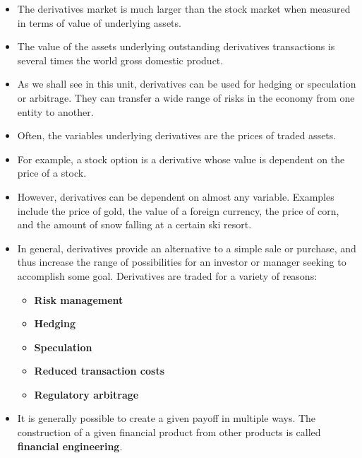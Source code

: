 \documentclass[letterpaper,10pt]{article}
\begin{document}
\begin{itemize}

\item The derivatives market is much larger than the stock market when measured in terms of value of underlying assets. 

\item The value of the assets underlying outstanding derivatives transactions is several times the world gross domestic product. 

\item As we shall see in this unit, derivatives can be used for hedging or speculation or arbitrage. They can transfer a wide range of risks in the economy from one entity to another.

\item Often, the variables underlying derivatives are the prices of traded assets.  

\item For example, a stock option is a derivative whose value is dependent on the price of a stock.

\item However, derivatives can be dependent on almost any variable.  Examples include the price of gold, the value of a foreign currency, the price of corn, and  the amount of snow falling at a certain ski resort.

\item In general, derivatives provide an alternative to a simple sale or purchase, and thus increase the range of possibilities for an investor or manager seeking to accomplish some goal.  Derivatives are traded for a variety of reasons:

\begin{itemize}

\item {\bf Risk management}

\item {\bf Hedging}

\item {\bf Speculation}

\item {\bf Reduced transaction costs}

\item {\bf Regulatory arbitrage}

\end{itemize}

\item It is generally possible to create a given payoff in multiple ways. The construction of a given financial product from other products is called {\bf financial engineering}.


\end{itemize}
\end{document}

